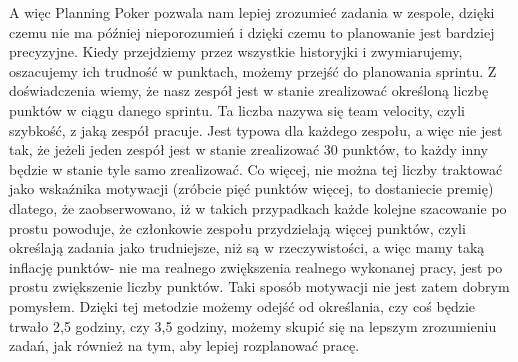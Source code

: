 A więc Planning Poker pozwala nam lepiej zrozumieć zadania w zespole,
dzięki czemu nie ma później nieporozumień i dzięki czemu to planowanie jest bardziej precyzyjne.
Kiedy przejdziemy przez wszystkie historyjki i zwymiarujemy, oszacujemy ich trudność w punktach,
możemy przejść do planowania sprintu.
Z doświadczenia wiemy, że nasz zespół jest w stanie zrealizować określoną liczbę punktów w ciągu danego sprintu.
Ta liczba nazywa się team velocity, czyli szybkość, z jaką zespół pracuje. Jest typowa dla każdego zespołu,
a więc nie jest tak, że jeżeli jeden zespół jest w stanie zrealizować 30 punktów, to każdy inny będzie w stanie tyle samo zrealizować.
Co więcej, nie można tej liczby traktować jako wskaźnika motywacji (zróbcie pięć punktów więcej, to dostaniecie premię) dlatego,
że zaobserwowano, iż w takich przypadkach każde kolejne szacowanie po prostu powoduje,
że członkowie zespołu przydzielają więcej punktów, czyli określają zadania jako trudniejsze,
niż są w rzeczywistości, a więc mamy taką inflację punktów- nie ma realnego zwiększenia realnego wykonanej pracy,
jest po prostu zwiększenie liczby punktów. Taki sposób motywacji nie jest zatem dobrym pomysłem.
Dzięki tej metodzie możemy odejść od określania, czy coś będzie trwało 2,5 godziny,
czy 3,5 godziny, możemy skupić się na lepszym zrozumieniu zadań, jak również na tym, aby lepiej rozplanować pracę.
